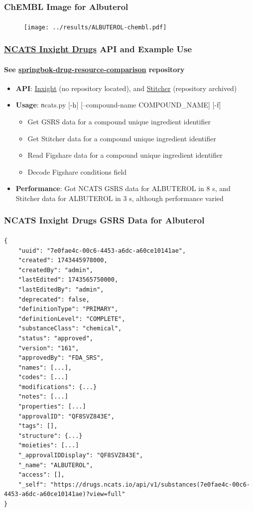 \documentclass[aspectratio=169,xcolor=dvipsnames]{beamer}
\begin{document}
\begin{frame}
  \frametitle{ChEMBL Image for Albuterol}
  \framesubtitle{}
  \begin{figure}
    \begin{center}
      \texttt{[image: ../results/ALBUTEROL-chembl.pdf]}
    \end{center}
  \end{figure}
\end{frame}

\begin{frame}
  \frametitle{\href{https://drugs.ncats.io/}{NCATS Inxight Drugs} API
    and Example Use}
  \framesubtitle{See
    \href{https://github.com/ralatsdc/springbok-drug-resource-comparison}{springbok-drug-resource-comparison}
    repository}
  \begin{itemize}
  \item[] \textbf{API}: \href{https://drugs.ncats.io/api}{Inxight} (no repository
    located), and \href{https://github.com/ncats/stitcher}{Stitcher}
    (repository archived)
  \item[] \textbf{Usage}: {\texttt ncats.py [-h] [--compound-name COMPOUND\_NAME]
    [-f]}
    \begin{itemize}
    \item Get GSRS data for a compound unique ingredient identifier
    \item Get Stitcher data for a compound unique ingredient identifier
    \item Read Figshare data for a compound unique ingredient identifier
    \item Decode Figshare conditions field
    \end{itemize}
  \item[] \textbf{Performance}: Got NCATS GSRS data for ALBUTEROL in 8 s, and
    Stitcher data for ALBUTEROL in 3 s, although performance varied
  \end{itemize}
\end{frame}

\begin{frame}[fragile,t]
  \frametitle{NCATS Inxight Drugs GSRS Data for Albuterol}
  \framesubtitle{}
  \tiny
\begin{verbatim}
{
    "uuid": "7e0fae4c-00c6-4453-a6dc-a60ce10141ae",
    "created": 1743445978000,
    "createdBy": "admin",
    "lastEdited": 1743565750000,
    "lastEditedBy": "admin",
    "deprecated": false,
    "definitionType": "PRIMARY",
    "definitionLevel": "COMPLETE",
    "substanceClass": "chemical",
    "status": "approved",
    "version": "161",
    "approvedBy": "FDA_SRS",
    "names": [...],
    "codes": [...]
    "modifications": {...}
    "notes": [...]
    "properties": [...]
    "approvalID": "QF8SVZ843E",
    "tags": [],
    "structure": {...}
    "moieties": [...]
    "_approvalIDDisplay": "QF8SVZ843E",
    "_name": "ALBUTEROL",
    "access": [],
    "_self": "https://drugs.ncats.io/api/v1/substances(7e0fae4c-00c6-4453-a6dc-a60ce10141ae)?view=full"
}
\end{verbatim}
\end{frame}
\end{document}
